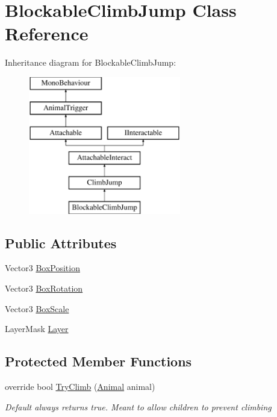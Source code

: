 \hypertarget{class_blockable_climb_jump}{}\section{Blockable\+Climb\+Jump Class Reference}
\label{class_blockable_climb_jump}
Inheritance diagram for Blockable\+Climb\+Jump\+:\begin{figure}[H]
\begin{center}
\leavevmode
\includegraphics[height=6.000000cm]{class_blockable_climb_jump}
\end{center}
\end{figure}
\subsection*{Public Attributes}
\begin{DoxyCompactItemize}
\item 
Vector3 \mbox{\hyperlink{class_blockable_climb_jump_a858c667d461fc69cdbe6fa09fa4bda81}{Box\+Position}}
\item 
Vector3 \mbox{\hyperlink{class_blockable_climb_jump_a1b34172df56ff53db29bbfc49e1b350b}{Box\+Rotation}}
\item 
Vector3 \mbox{\hyperlink{class_blockable_climb_jump_ac252c4f74139236040929344a1a009b7}{Box\+Scale}}
\item 
Layer\+Mask \mbox{\hyperlink{class_blockable_climb_jump_a847685bde4d1d41e6edbdb5afa6238c5}{Layer}}
\end{DoxyCompactItemize}
\subsection*{Protected Member Functions}
\begin{DoxyCompactItemize}
\item 
override bool \mbox{\hyperlink{class_blockable_climb_jump_a58cf472a84d9fb9f01800f75b56fd197}{Try\+Climb}} (\mbox{\hyperlink{class_animal}{Animal}} animal)
\begin{DoxyCompactList}\small\item\em Default always returns true. Meant to allow children to prevent climbing \end{DoxyCompactList}\end{DoxyCompactItemize}
